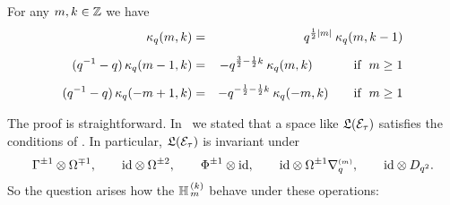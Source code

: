 \begin{lemma} \label{lemma:kq:formulas}
For any $m,k\in\mathbb{Z}$ we have
\begin{eqnarray}
\kq(m,k)                 &=&        q^{\frac{1}{2}|m|} \: \kq(m,k-1)
       \label{eq:kq:formula1} \\
(q^{-1}-q)\, \kq(m-1,k)  &\vertXL=& -q^{\frac{3}{2} -\frac{1}{2}k}\: \kq(m,k)
                       \hspace{3em}\;   {\rm if}\;\; m\geq 1
       \label{eq:kq:formula2}\\
(q^{-1}-q)\, \kq(-m+1,k) &\vertXL=& -q^{-\frac{1}{2} -\frac{1}{2}k}\: \kq(-m,k)
                       \hspace{2em}     {\rm if}\;\; m\geq 1
       \label{eq:kq:formula3}
\end{eqnarray}
\end{lemma}

The proof is straightforward.
In \mbox{\cite{Jeroen:QE2:haar}}\ we stated that a space like
$\mathfrak{L}(\mathcal E_\tau)$ satisfies the conditions of
\mbox{\cite[proposition 3.3.1.1]{Jeroen:QE2:haar}}\@.
In particular, $\mathfrak{L}(\mathcal E_\tau)$ is invariant under
$$\Gamma^{\pm 1} \otimes \Omega^{\mp 1},   \hspace{2em}
\mbox{\rm id} \otimes \Omega^{\pm 2},                \hspace{2em}
\Phi^{\pm 1} \otimes \mbox{\rm id},                  \hspace{2em}
\mbox{\rm id} \otimes \Omega^{\pm 1} \nabla_q^{\scriptscriptstyle (m)},       \hspace{2em}
\mbox{\rm id} \otimes D_{q^2}. $$
So the question arises how the $\mathbb{H}_{\,m}^{\,(k)}$ behave under these operations:

